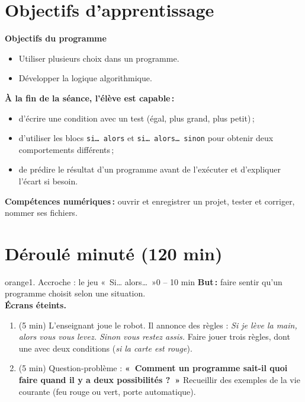 \documentclass[11pt,a4paper]{article}
\begin{document}
\section{Objectifs d'apprentissage}
\begin{tcolorbox}[colback=gray!8,colframe=gray!60!black,arc=1mm,boxrule=0.5pt]
\textbf{Objectifs du programme}
\begin{itemize}
 \item Utiliser plusieurs choix dans un programme.
 \item Développer la logique algorithmique.
\end{itemize}
\textbf{À la fin de la séance, l'élève est capable\,:}
\begin{itemize}
 \item d'écrire une condition avec un test (égal, plus grand, plus petit)\,;
 \item d'utiliser les blocs \texttt{si\ldots{} alors} et \texttt{si\ldots{} alors\ldots{} sinon} pour obtenir deux comportements différents\,;
 \item de prédire le résultat d'un programme avant de l'exécuter et d'expliquer l'écart si besoin.
\end{itemize}
\textbf{Compétences numériques\,:} ouvrir et enregistrer un projet, tester et corriger, nommer ses fichiers.
\end{tcolorbox}

\section{Déroulé minuté (120 min)}

\begin{etape}{orange}{1. Accroche : le jeu «~Si\ldots{} alors\ldots~»}{0 -- 10 min}
\textbf{But\,:} faire sentir qu'un programme choisit selon une situation.\\
\textbf{Écrans éteints.}
\begin{enumerate}
 \item (5 min) L'enseignant joue le robot. Il annonce des règles : \emph{Si je lève la main, alors vous vous levez. Sinon vous restez assis.} Faire jouer trois règles, dont une avec deux conditions (\emph{si la carte est rouge}).
 \item (5 min) Question-problème : \textbf{«~Comment un programme sait-il quoi faire quand il y a deux possibilités ?~»} Recueillir des exemples de la vie courante (feu rouge ou vert, porte automatique).
\end{enumerate}
\end{etape}
\end{document}
